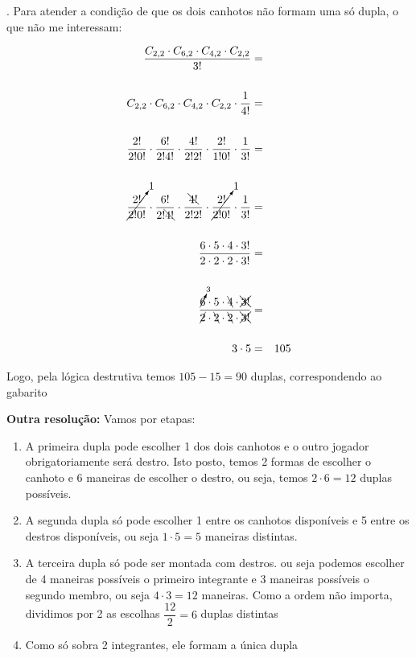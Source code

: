 . Para atender a condição de que os dois canhotos não formam uma só dupla, o que não me interessam:

\begin{eqnarray*}
\dfrac{C_{2, 2} \cdot C_{6, 2} \cdot C_{4, 2} \cdot C_{2, 2}  }{3!} &=& \\
\\
C_{2, 2} \cdot C_{6, 2} \cdot C_{4, 2} \cdot C_{2, 2}  \cdot \dfrac{1}{4!} &=& \\
\\
\dfrac{2!}{2! 0!} \cdot \dfrac{6!}{2! 4!} \cdot \dfrac{4!}{2! 2!} \cdot \dfrac{2!}{1! 0!} \cdot
\dfrac{1}{3!}  &=& \\
\\
\cancelto{1}{\dfrac{2!}{2! 0!}} \cdot \dfrac{6!}{2! \bcancel{4!}} \cdot \dfrac{\bcancel{4!}}{2! 2!} \cdot \cancelto{1}{\dfrac{2!}{2! 0!}}  \cdot
\dfrac{1}{3!}  &=& \\
\\
\dfrac{6 \cdot 5 \cdot 4 \cdot 3!}{ 2 \cdot 2 \cdot 2 \cdot 3!}  &=& \\
\\
\dfrac{\cancelto{3}{6} \cdot 5 \cdot \bcancel{4} \cdot \xcancel{3!}}{ \cancel{2} \cdot \bcancel{2} \cdot \bcancel{2} \cdot \xcancel{3!}}  &=& \\
\\
3 \cdot 5  &=& 105
\end{eqnarray*}
 
Logo, pela lógica destrutiva temos $ 105 - 15 = 90 $ duplas, correspondendo ao gabarito

\textbf{Outra resolução:}
Vamos por etapas:

\begin{enumerate}
    \item A primeira dupla pode escolher 1 dos dois canhotos e o outro jogador obrigatoriamente será destro. Isto posto, temos 2 formas de escolher o canhoto e 6 maneiras de escolher o destro, ou seja, temos $ 2 \cdot 6 = 12 $ duplas possíveis. 
    \item A segunda dupla só pode escolher 1 entre os canhotos disponíveis e 5 entre os destros disponíveis, ou seja $ 1 \cdot 5  = 5 $ maneiras distintas.
    \item A terceira dupla só pode ser montada com destros. ou seja podemos escolher de 4 maneiras possíveis o primeiro integrante e 3 maneiras possíveis o segundo membro, ou seja $ 4 \cdot 3  = 12 $ maneiras. Como a ordem não importa, dividimos por 2 as escolhas $ \dfrac{12}{2} = 6$ duplas distintas
    \item Como só sobra 2 integrantes, ele formam a única dupla
\end{enumerate}

